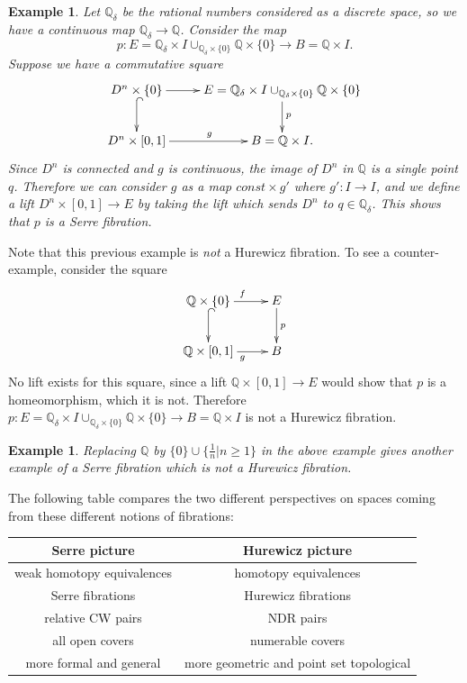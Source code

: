 \documentclass{article}
\newtheorem{example}[theorem]{Example}
\newtheorem{proposed work}[theorem]{Proposed Work}
\theoremstyle{definition}
\def\Q{\mathbb Q}\def\R{\mathbb R}
\newcommand{\xymat}[1]{\begin{align*}\xymatrix{ #1}\end{align*}}
\begin{document}
\begin{example}
Let $\mathbb{Q}_\delta$ be the rational numbers considered as a discrete space, so we have a continuous map $\mathbb{Q}_\delta\to \mathbb{Q}$. Consider the map 
$$p:E=\mathbb{Q}_\delta\times I\cup_{\mathbb{Q}_\delta\times \lbrace 0\rbrace} \mathbb{Q}\times \lbrace 0\rbrace \to B=\mathbb{Q}\times I.$$ 
Suppose we have a commutative square
\xymat{D^n\times \lbrace 0\rbrace \ar[r] \ar@{^{(}->}[d] & E=\mathbb{Q}_\delta\times I\cup_{\mathbb{Q}_\delta\times \lbrace 0\rbrace} \mathbb{Q}\times \lbrace 0\rbrace \ar[d]^p \\ D^n\times [0,1] \ar[r]^g & B=\mathbb{Q}\times I.}
Since $D^n$ is connected and $g$ is continuous, the image of $D^n$ in $\mathbb{Q}$ is a single point $q$. Therefore we can consider $g$ as a map $const \times g'$ where $g' : I\to I$, and we define a lift $D^n \times [0,1] \to E$ by taking the lift which sends $D^n$ to $q \in \mathbb{Q}_\delta$. This shows that $p$ is a Serre fibration. 
\end{example}
Note that this previous example is \textit{not} a Hurewicz fibration. To see a counter-example, consider the square
\xymat{\mathbb{Q}\times \lbrace 0\rbrace \ar[r]^f \ar@{^{(}->}[d] & E \ar[d]^p \\ \mathbb{Q}\times [0,1] \ar[r]_g & B}
No lift exists for this square, since a lift $\Q \times [0,1] \to E$ would show that $p$ is a homeomorphism, which it is not. Therefore  $p:E=\mathbb{Q}_\delta\times I\cup_{\mathbb{Q}_\delta\times \lbrace 0\rbrace} \mathbb{Q}\times \lbrace 0\rbrace \to B=\mathbb{Q}\times I$ is not a Hurewicz fibration.
\begin{example}
Replacing $\mathbb{Q}$ by $\lbrace 0 \rbrace \cup \lbrace \frac{1}{n}|n\geq 1\rbrace$ in the above example gives another example of a Serre fibration which is not a Hurewicz fibration. 
\end{example}
The following table compares the two different perspectives on spaces coming from these different notions of fibrations:\\

\begin{tabular}{|c|c|}
\hline 
\textbf{Serre picture} & \textbf{Hurewicz picture} \\ 
\hline 
weak homotopy equivalences & homotopy equivalences \\ 
\hline 
Serre fibrations & Hurewicz fibrations \\ 
\hline 
relative CW pairs & NDR pairs \\ 
\hline 
all open covers & numerable covers \\ 
\hline 
more formal and general & more geometric and point set topological \\ 
\hline 
\end{tabular} 
\end{document}
